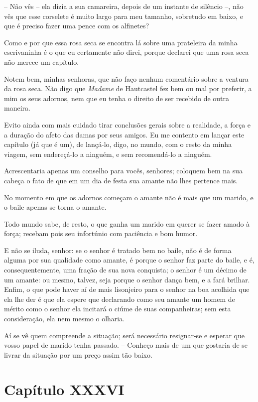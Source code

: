  -- Não vês -- ela dizia a sua camareira, depois de um instante de
silêncio --, não vês que esse corselete é muito largo para meu
tamanho, sobretudo em baixo, e que é preciso fazer uma pence com os
alfinetes?

 Como e por que essa rosa seca se encontra lá sobre uma prateleira da
minha escrivaninha é o que eu certamente não direi, porque declarei que
uma rosa seca não merece um capítulo.

 Notem bem, minhas senhoras, que não faço nenhum comentário sobre a
ventura da rosa seca. Não digo que \textit{Madame} de Hautcastel fez
bem ou mal por preferir, a mim os seus adornos, nem que eu tenha o
direito de ser recebido de outra maneira. 

 Evito ainda com mais cuidado tirar conclusões gerais sobre a realidade,
a força e a duração do afeto das damas por seus amigos. Eu me contento
em lançar este capítulo (já que é um), de lançá-lo, digo, no mundo, com
o resto da minha viagem, sem endereçá-lo a ninguém, e sem recomendá-lo
a ninguém.

 Acrescentaria apenas um conselho para vocês, senhores; coloquem bem na
sua cabeça o fato de que em um dia de festa sua amante não lhes
pertence mais.

 No momento em que os adornos começam o amante não é mais que um marido,
e o baile apenas se torna o amante.

 Todo mundo sabe, de resto, o que ganha um marido em querer se fazer
amado à força; recebam pois seu infortúnio com paciência e bom humor.

 E não se iluda, senhor: se o senhor é tratado bem no baile, não é de
forma alguma por sua qualidade como amante, é porque o senhor faz parte
do baile, e é, consequentemente, uma fração de sua nova conquista; o
senhor é um décimo de um amante: ou mesmo, talvez, seja porque o senhor
dança bem, e a fará brilhar. Enfim, o que pode haver aí de mais
lisonjeiro para o senhor na boa acolhida que ela lhe der é que ela
espere que declarando como seu amante um homem de mérito como o senhor
ela incitará o ciúme de suas companheiras; sem esta consideração, ela
nem mesmo o olharia. 

 Aí se vê quem compreende a situação; será necessário resignar-se e
esperar que vosso papel de marido tenha passado. -- Conheço mais de um
que gostaria de se livrar da situação por um preço assim tão baixo.

\section{Capítulo XXXVI}

